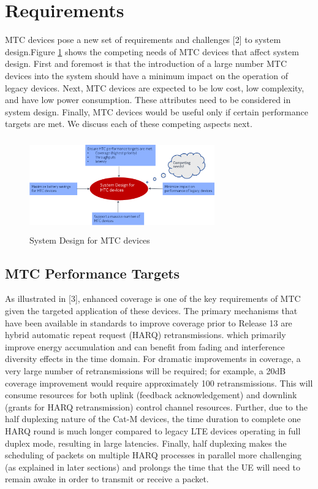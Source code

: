 \documentclass[conference,compsoc]{IEEEtran}
\begin{document}
\section{Requirements}
MTC devices pose a new set of requirements and challenges [2] to system design.Figure \ref{fig_sys_design} shows the competing needs of MTC devices that affect system design. First and foremost is that the introduction of a large number MTC devices into the system should have a minimum impact on the operation of legacy devices. Next, MTC devices are expected to be low cost, low complexity, and have low power consumption. These attributes need to be considered in system design. Finally, MTC devices would be useful only if certain performance targets are met. We discuss each of these competing aspects next.

\begin{figure}[htbp]
\centerline{\includegraphics[height=40mm,width=80mm]{sys_design.png}}
\caption{System Design for MTC devices}
\label{fig_sys_design}
\end{figure}

\subsection{MTC Performance Targets}
As illustrated in [3], enhanced coverage is one of the key requirements of   MTC given the targeted application of these devices. The primary mechanisms that have been available in standards to improve coverage prior to Release 13 are hybrid automatic repeat request (HARQ) retransmissions. which primarily improve energy accumulation and can benefit from fading and interference diversity effects in the time domain.  For dramatic improvements in coverage, a very large number of retransmissions will be required; for example, a 20dB coverage improvement would require approximately 100 retransmissions. This will consume resources for both uplink (feedback acknowledgement) and downlink (grants for HARQ retransmission) control channel resources. Further, due to the half duplexing nature of the Cat-M devices, the time duration to complete one HARQ round is much longer compared to legacy LTE devices operating in full duplex mode, resulting in large latencies. Finally, half duplexing makes the scheduling of packets on multiple HARQ processes in parallel more challenging (as explained in later sections) and prolongs the time that the UE will need to remain awake in order to transmit or receive a packet.  
\end{document}
